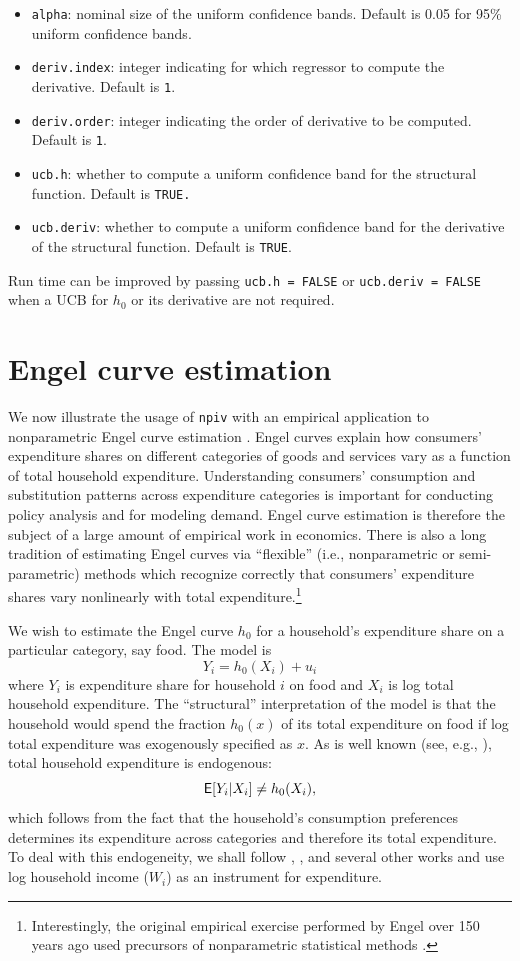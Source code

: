 \documentclass[
]{jss}
\begin{document}
\begin{itemize}
\item
  \texttt{alpha}: nominal size of the uniform confidence bands. Default
  is 0.05 for 95\% uniform confidence bands.
\item
  \texttt{deriv.index}: integer indicating for which regressor to
  compute the derivative. Default is \texttt{1}.
\item
  \texttt{deriv.order}: integer indicating the order of derivative to be
  computed. Default is \texttt{1}.
\item
  \texttt{ucb.h}: whether to compute a uniform confidence band for the
  structural function. Default is \texttt{TRUE.}
\item
  \texttt{ucb.deriv}: whether to compute a uniform confidence band for
  the derivative of the structural function. Default is \texttt{TRUE}.
\end{itemize}

Run time can be improved by passing \texttt{ucb.h\ =\ FALSE} or
\texttt{ucb.deriv\ =\ FALSE} when a UCB for \(h_0\) or its derivative
are not required.

\hypertarget{engel}{%
\section{Engel curve estimation}\label{engel}}

We now illustrate the usage of \texttt{npiv} with an empirical
application to nonparametric Engel curve estimation \citep{BCK}. Engel
curves explain how consumers' expenditure shares on different categories
of goods and services vary as a function of total household expenditure.
Understanding consumers' consumption and substitution patterns across
expenditure categories is important for conducting policy analysis and
for modeling demand. Engel curve estimation is therefore the subject of
a large amount of empirical work in economics. There is also a long
tradition of estimating Engel curves via ``flexible'' (i.e.,
nonparametric or semi-parametric) methods which recognize correctly that
consumers' expenditure shares vary nonlinearly with total
expenditure.\footnote{Interestingly, the original empirical exercise
  performed by Engel over 150 years ago used precursors of nonparametric
  statistical methods \citep{CM}.}

We wish to estimate the Engel curve \(h_0\) for a household's
expenditure share on a particular category, say food. The model is \[
 Y_i = h_0(X_i) + u_i
\] where \(Y_i\) is expenditure share for household \(i\) on food and
\(X_i\) is log total household expenditure. The ``structural''
interpretation of the model is that the household would spend the
fraction \(h_0(x)\) of its total expenditure on food if log total
expenditure was exogenously specified as \(x\). As is well known (see,
e.g., \citet{BBL}), total household expenditure is endogenous: \[
 \mathsf{E}[Y_i | X_i] \neq h_0(X_i),
\] which follows from the fact that the household's consumption
preferences determines its expenditure across categories and therefore
its total expenditure. To deal with this endogeneity, we shall follow
\citet{BBL}, \citet{BCK}, and several other works and use log household
income (\(W_i\)) as an instrument for expenditure.
\end{document}

